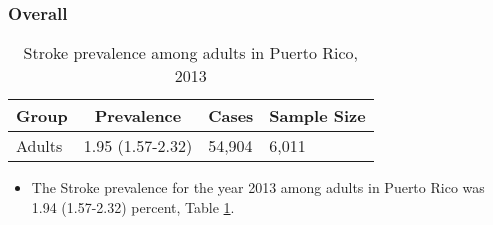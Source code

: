 
\subsubsection{Overall}




\begin{table}[H]
\caption{Stroke prevalence among adults in Puerto Rico, 2013\label{tab:Overall.tabl.Stroke.2013}} 
\begin{center}
\begin{tabular}{llll}
\hline\hline
\multicolumn{1}{l}{Group}&\multicolumn{1}{c}{Prevalence}&\multicolumn{1}{c}{Cases}&\multicolumn{1}{c}{Sample Size}\tabularnewline
\hline
Adults&1.95 (1.57-2.32)&54,904&6,011\tabularnewline
\hline
\end{tabular}\end{center}

\end{table}




\begin{itemize}


\item The Stroke prevalence for the year 2013 among adults in Puerto Rico was 1.94 (1.57-2.32) percent, 
Table \ref{tab:Overall.tabl.Stroke.2013}.

\end{itemize}



